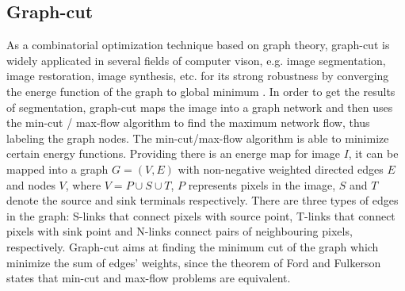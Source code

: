 \documentclass[journal]{IEEEtran}
\begin{document}
\subsection{Graph-cut}
As a combinatorial optimization technique based on graph theory, graph-cut is widely applicated in several fields of computer vison, e.g. image segmentation, image restoration, image synthesis, etc. for its strong robustness by converging the energe function of the graph to global minimum \cite{Boykov2004,Kwatra2003Graphcut}. In order to get the results of segmentation, graph-cut maps the image into a graph network and then uses the min-cut / max-flow algorithm to find the maximum network flow, thus labeling the graph nodes. The min-cut/max-flow algorithm is able to minimize certain energy functions. Providing there is an energe map for image $I$, it can be mapped into a graph $G=\left( V,E\right) $ with non-negative weighted directed edges $E$ and nodes $V$, where $V=P\cup  S\cup T$, $P$ represents pixels in the image, $S$ and $T$ denote the source and sink terminals respectively. There are three types of edges in the graph: S-links that connect pixels with source point, T-links that connect pixels with sink point and N-links connect pairs of neighbouring pixels, respectively. Graph-cut aims at finding the minimum cut of the graph which minimize the sum of edges' weights, since the theorem of Ford and Fulkerson states that min-cut and max-flow problems are equivalent\cite{FordJr2015}.\par
\end{document}
